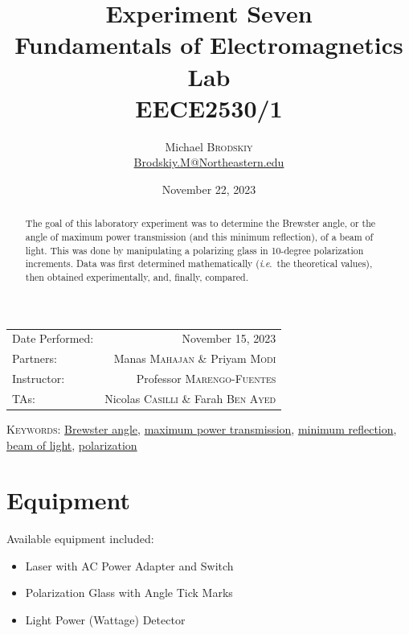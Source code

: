 \documentclass[
	letterpaper, %
	10pt, %
]{CSUniSchoolLabReport}
\title{Experiment Seven\\ Fundamentals of Electromagnetics Lab \\ EECE2530/1} %
\author{Michael \textsc{Brodskiy}\\ \small \href{mailto:Brodskiy.M@Northeastern.edu}{Brodskiy.M@Northeastern.edu}}
\date{November 22, 2023} %
\begin{document}
\maketitle %

\begin{center}
	\begin{tabular}{l r}
		Date Performed: & November 15, 2023 \\ %
        Partners: & Manas \textsc{Mahajan} \& Priyam \textsc{Modi} \\ %
		Instructor: & Professor \textsc{Marengo-Fuentes} \\ %
        TAs: & Nicolas \textsc{Casilli} \& Farah \textsc{Ben Ayed} \\ %
	\end{tabular}
\end{center}

\newpage

\begin{abstract}

  The goal of this laboratory experiment was to determine the Brewster angle, or the angle of maximum power transmission (and this minimum reflection), of a beam of light. This was done by manipulating a polarizing glass in 10-degree polarization increments. Data was first determined mathematically (\textit{i}.\textit{e}.\ the theoretical values), then obtained experimentally, and, finally, compared.

\end{abstract}

\begin{flushleft}

  \textsc{Keywords:} \underline{Brewster angle}, \underline{maximum power transmission}, \underline{minimum reflection}, \underline{beam of light}, \underline{polarization}

\end{flushleft}

\newpage

\section{Equipment}

\hspace{.5 in} Available equipment included:\\

\begin{itemize}

  \item Laser with AC Power Adapter and Switch

  \item Polarization Glass with Angle Tick Marks

  \item Light Power (Wattage) Detector

\end{itemize}
\end{document}
